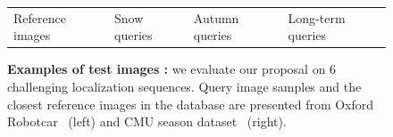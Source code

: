 \begin{figure}[t]
\begin{minipage}[t]{0.55\linewidth}
		\scriptsize
		\begin{tabularx}{\linewidth}{X X X X}
			Reference images & Snow queries & Autumn queries & Long-term queries 
		\end{tabularx}
	\end{minipage}

	\caption[Examples of test images]{\label{fig:dataset} \textbf{Examples of test images :} we evaluate our proposal on 6 challenging localization sequences. Query image samples and the closest reference images in the database are presented from Oxford Robotcar~\cite{Maddern2016} (left) and CMU season dataset~\cite{Bansal2014a} (right).}
\end{figure}

